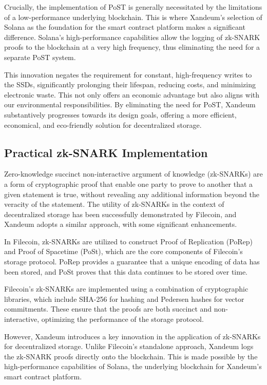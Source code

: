 \documentclass[11pt]{article}   	%
\begin{document}
Crucially, the implementation of PoST is generally necessitated by the limitations of a low-performance underlying blockchain. This is where Xandeum's selection of Solana as the foundation for the smart contract platform makes a significant difference. Solana's high-performance capabilities allow the logging of zk-SNARK proofs to the blockchain at a very high frequency, thus eliminating the need for a separate PoST system.

This innovation negates the requirement for constant, high-frequency writes to the SSDs, significantly prolonging their lifespan, reducing costs, and minimizing electronic waste. This not only offers an economic advantage but also aligns with our environmental responsibilities. By eliminating the need for PoST, Xandeum substantively progresses towards its design goals, offering a more efficient, economical, and eco-friendly solution for decentralized storage.

\subsection{Practical zk-SNARK Implementation}
Zero-knowledge succinct non-interactive argument of knowledge (zk-SNARKs) are a form of cryptographic proof that enable one party to prove to another that a given statement is true, without revealing any additional information beyond the veracity of the statement. The utility of zk-SNARKs in the context of decentralized storage has been successfully demonstrated by Filecoin, and Xandeum adopts a similar approach, with some significant enhancements.

In Filecoin, zk-SNARKs are utilized to construct Proof of Replication (PoRep) and Proof of Spacetime (PoSt), which are the core components of Filecoin's storage protocol. PoRep provides a guarantee that a unique encoding of data has been stored, and PoSt proves that this data continues to be stored over time.

Filecoin's zk-SNARKs are implemented using a combination of cryptographic libraries, which include SHA-256 for hashing and Pedersen hashes for vector commitments. These ensure that the proofs are both succinct and non-interactive, optimizing the performance of the storage protocol.

However, Xandeum introduces a key innovation in the application of zk-SNARKs for decentralized storage. Unlike Filecoin's standalone approach, Xandeum logs the zk-SNARK proofs directly onto the blockchain. This is made possible by the high-performance capabilities of Solana, the underlying blockchain for Xandeum's smart contract platform.
\end{document}
